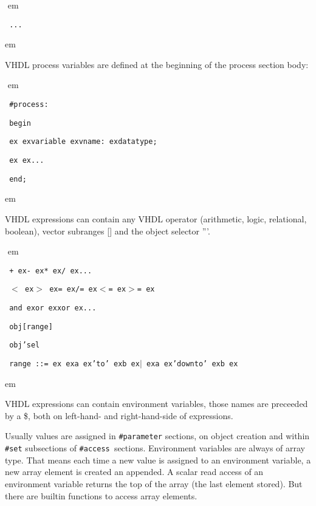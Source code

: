\documentclass[a4paper,12pt,twoside,english]{article}
\def\s{\hskip 1.15 ex}
\begin{document}
\begin{description}
\begin{description}
\def\prefskipu{}\def\prefskipo{}\def\prefskipa{}\def\prefskipu{\hskip10pt}\def\prefskipo{\hskip10pt}\def\prefskipa{\hskip30pt}\def\content{
\vskip-5pt{\parindent0pt\parbox{\linewidth}{\tt\smallsize\hskip10pt ...}}
}
$ $
 em
\content
{} em
\item[\colorit{\bf process variables}] $ $\\
VHDL process variables are defined at the beginning of the process section body:

\def\prefskipu{}\def\prefskipo{}\def\prefskipa{}\def\prefskipu{\hskip10pt}\def\prefskipo{\hskip10pt}\def\prefskipa{\hskip30pt}\def\content{
\vskip-5pt{\parindent0pt\parbox{\linewidth}{\tt\smallsize\hskip10pt \#process:}}
\vskip-5pt{\parindent0pt\parbox{\linewidth}{\tt\smallsize\hskip10pt begin}}
\vskip-5pt{\parindent0pt\parbox{\linewidth}{\tt\smallsize\hskip10pt \s \s variable\s vname:\s datatype;}}
\vskip-5pt{\parindent0pt\parbox{\linewidth}{\tt\smallsize\hskip10pt \s \s ...}}
\vskip-5pt{\parindent0pt\parbox{\linewidth}{\tt\smallsize\hskip10pt end;}}
}
$ $
 em
\content
{} em
\item[\colorit{\bf Expressions}] $ $\\
VHDL expressions can contain any VHDL operator (arithmetic, logic, relational, boolean), vector subranges {[}{]} and the object selector '''. 

\def\prefskipu{}\def\prefskipo{}\def\prefskipa{}\def\prefskipu{\hskip10pt}\def\prefskipo{\hskip10pt}\def\prefskipa{\hskip30pt}\def\content{
\vskip-5pt{\parindent0pt\parbox{\linewidth}{\tt\smallsize\hskip10pt +\s -\s *\s /\s ...}}
\vskip-5pt{\parindent0pt\parbox{\linewidth}{\tt\smallsize\hskip10pt $<$\s $>$\s =\s /=\s $<$=\s $>$=\s }}
\vskip-5pt{\parindent0pt\parbox{\linewidth}{\tt\smallsize\hskip10pt and\s or\s xor\s ...}}
\vskip-5pt{\parindent0pt\parbox{\linewidth}{\tt\smallsize\hskip10pt obj{[}range{]}}}
\vskip-5pt{\parindent0pt\parbox{\linewidth}{\tt\smallsize\hskip10pt obj'sel}}
\vskip-5pt{\parindent0pt\parbox{\linewidth}{\tt\smallsize\hskip10pt range~::=\s \s a\s 'to'\s b\s $|$\s a\s 'downto'\s b\s }}
}
$ $
 em
\content
{} em
\item[\colorit{\bf Environment Variables}] $ $\\
VHDL expressions can contain environment variables, those names are preceeded by a \$, both on left-hand- and right-hand-side of expressions. 

Usually values are assigned in {\tt \#parameter} sections, on object creation and within {\tt \#set} subsections of {\tt \#access }sections. Environment
variables are always of array type. That means each time a new value is assigned to an environment variable, a new array element is created an appended.  A
scalar read access of an environment variable returns the top of the array (the last element stored). But there are builtin functions to access array elements. 


\end{description}
\end{description}
\end{document}
